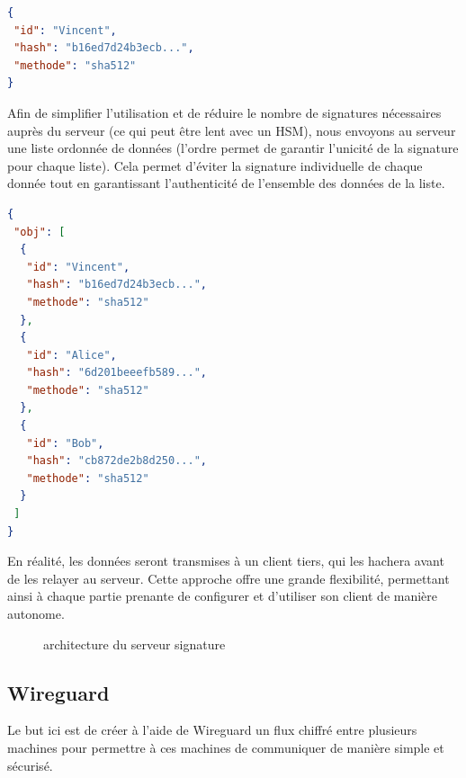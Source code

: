 \documentclass[a4paper, 12pt]{article}
\begin{document}
\begin{center}
\begin{minipage}{.51\linewidth}
\begin{lstlisting}[language = json]
{
 "id": "Vincent",
 "hash": "b16ed7d24b3ecb...",
 "methode": "sha512"
}
\end{lstlisting}
\end{minipage}
\end{center}
Afin de simplifier l'utilisation et de réduire le nombre de signatures nécessaires auprès du serveur (ce qui peut être lent avec un HSM), nous envoyons au serveur une liste ordonnée de données (l'ordre permet de garantir l'unicité de la signature pour chaque liste). Cela permet d'éviter la signature individuelle de chaque donnée tout en garantissant l'authenticité de l'ensemble des données de la liste.
\begin{center}
\begin{minipage}{.51\linewidth}
\begin{lstlisting}[language = json]
{
 "obj": [
  {
   "id": "Vincent",
   "hash": "b16ed7d24b3ecb...",
   "methode": "sha512"
  },
  {
   "id": "Alice",
   "hash": "6d201beeefb589...",
   "methode": "sha512"
  },
  {
   "id": "Bob",
   "hash": "cb872de2b8d250...",
   "methode": "sha512"
  }
 ]
}
\end{lstlisting}
\end{minipage}
\end{center}
En réalité, les données seront transmises à un client tiers, qui les hachera avant de les relayer au serveur. Cette approche offre une grande flexibilité, permettant ainsi à chaque partie prenante de configurer et d'utiliser son client de manière autonome.
\begin{figure}[h]
\centering
{}
\caption{architecture du serveur signature}
\label{shema_serveur_signature}
\end{figure}

\subsection{Wireguard}
Le but ici est de créer à l'aide de Wireguard un flux chiffré entre plusieurs machines pour permettre à ces machines de communiquer de manière simple et sécurisé.
\end{document}
